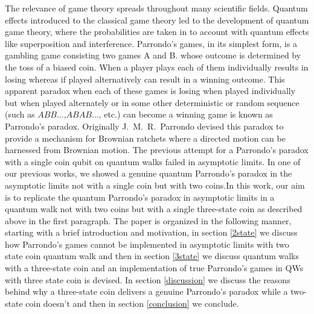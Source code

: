 \documentclass[english,aps,pra,amsmath,amssymb,showpacs,notitlepage,onecolumn]{revtex4-1}
\begin{document}
The relevance of game theory spreads throughout many scientific fields. Quantum effects introduced to the classical game theory led to the development of quantum game theory, where the probabilities are taken in to account with quantum effects like superposition and interference\cite{q_game}. Parrondo's games\cite{parrondo}, in its simplest form, is a gambling game consisting two games A and B. whose outcome is determined by the toss of a biased coin. When a player plays each of them individually results in losing whereas if played alternatively can result in a winning outcome. This apparent paradox when each of these games is losing when played individually but when played alternately or in some other deterministic or random sequence (such as $ABB\ldots$,$ABAB\ldots$, etc.) can become a winning game is known as Parrondo's paradox. Originally J.~M.~R.~Parrondo devised this paradox to provide a mechanism for Brownian ratchets where a directed motion can be harnessed from Brownian motion. The previous attempt for a Parrondo's paradox with a single coin qubit on quantum walks failed in asymptotic limits\cite{minli,flitney}. In one of our previous works, we showed a genuine quantum Parrondo's paradox in the asymptotic limits not with a single coin but with two coins\cite{previous}.In this work, our aim is to replicate the quantum Parrondo's paradox in asymptotic limits in a quantum walk not with two coins but with a single three-state coin as described above in the first paragraph. The paper is organized in the following manner, starting with a brief introduction and motivation, in section \ref{2state} we discuss how Parrondo's games cannot be implemented in asymptotic limits with two state coin quantum walk and then in section \ref{3state} we discuss quantum walks with a three-state coin and an implementation of true Parrondo's games in QWs with three state coin is devised. In section \ref{discussion} we discuss the reasons behind why a three-state coin delivers a genuine Parrondo's paradox while a two-state coin doesn't and then in section \ref{conclusion} we conclude.  
\\
\end{document}
